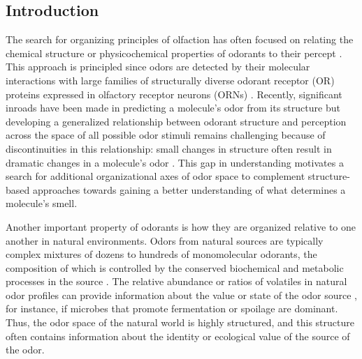 \documentclass[12pt]{caltech_thesis}
\renewcommand{\cite}{{ }\autocite}
\let\Oldsection\section
\renewcommand{\section}{\FloatBarrier\Oldsection}
\begin{document}
\begin{refsection}
\section{Introduction}
The search for organizing principles of olfaction has often focused on relating the chemical structure or physicochemical properties of odorants to their percept\cite{PerceptualLogicOfSmell}.
This approach is principled since odors are detected by their molecular interactions with large families of structurally diverse odorant receptor (OR) proteins expressed in olfactory receptor neurons (ORNs)\cite{ORNGeneFamily}.
Recently, significant inroads have been made in predicting a molecule's odor from its structure\cite{PleasantnessFromStructure,PerceptionFromChemFeatures} but developing a generalized relationship between odorant structure and perception across the space of all possible odor stimuli remains challenging because of discontinuities in this relationship: small changes in structure often result in dramatic changes in a molecule's odor\cite{PredictingOdorFromStructure,OdorUnpredictable}.
This gap in understanding motivates a search for additional organizational axes of odor space to complement structure-based approaches towards gaining a better understanding of what determines a molecule's smell.

Another important property of odorants is how they are organized relative to one another in natural environments.
Odors from natural sources are typically complex mixtures of dozens to hundreds of monomolecular odorants, the composition of which is controlled by the conserved biochemical and metabolic processes in the source\cite{YeastAroma,ChemicalCommunicationDisplays}.
The relative abundance or ratios of volatiles in natural odor profiles can provide information about the value or state of the odor source\cite{HyperbolicOdorsBees,FloralScentEvo}, for instance, if microbes that promote fermentation or spoilage are dominant.
Thus, the odor space of the natural world is highly structured, and this structure often contains information about the identity or ecological value of the source of the odor.


\end{refsection}
\end{document}
